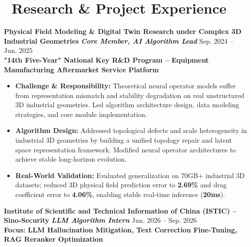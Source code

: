 \documentclass[11pt]{article}
\begin{document}
\section{\makebox[\widthof{\faBriefcase}][c]{\color{CVBlue}\faBriefcase}\ Research \& Project Experience}
\textbf{Physical Field Modeling \& Digital Twin Research under Complex 3D Industrial Geometries}
\textit{\textbf{Core Member, AI Algorithm Lead}}
\hfill Sep. 2024 -- Jun. 2025\\[0.2em]
\textcolor{CVBlue}{\textbf{"14th Five-Year" National Key R\&D Program -- Equipment Manufacturing Aftermarket Service Platform}}
\begin{itemize}
    \item \textbf{Challenge \& Responsibility:} Theoretical neural operator models suffer from representation mismatch and stability degradation on real unstructured 3D industrial geometries. Led algorithm architecture design, data modeling strategies, and core module implementation.
    \item \textbf{Algorithm Design:} Addressed topological defects and scale heterogeneity in industrial 3D geometries by building a unified topology repair and latent space representation framework. Modified neural operator architectures to achieve stable long-horizon evolution.
    \item \textbf{Real-World Validation:} Evaluated generalization on 70GB+ industrial 3D datasets; reduced 3D physical field prediction error to \textbf{2.69\%} and drag coefficient error to \textbf{4.06\%}, enabling stable real-time inference (\textbf{20ms}).
\end{itemize}
\vspace{0.6em}
\textbf{Institute of Scientific and Technical Information of China (ISTIC) -- Sino-Security} \textit{\textbf{LLM Algorithm Intern}} \hfill Jun. 2026 -- Sep. 2026\\[0.2em]
\textcolor{CVBlue}{\textbf{Focus: LLM Hallucination Mitigation, Text Correction Fine-Tuning, RAG Reranker Optimization}}
\end{document}
